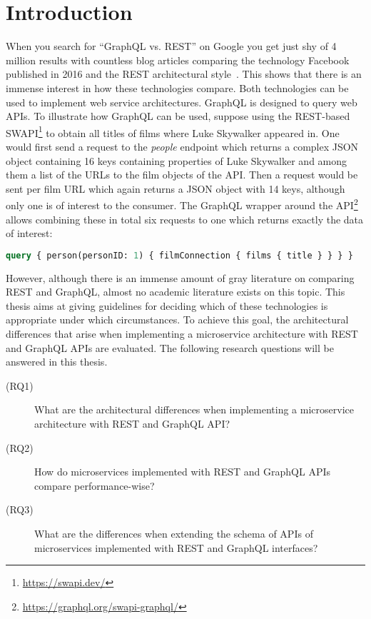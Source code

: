 \section{Introduction}\label{sec:introduction}

When you search for ``GraphQL vs. \acs{REST}'' on Google you get just shy of 4 million results with countless blog articles comparing the technology Facebook published in 2016 and the \acf{REST} architectural style~\cite{Brito2019}.
This shows that there is an immense interest in how these technologies compare.
Both technologies can be used to implement web service architectures.
GraphQL is designed to query web \acp{API}.
To illustrate how GraphQL can be used, suppose using the \ac{REST}-based \ac{SWAPI}\footnote{\url{https://swapi.dev/}} to obtain all titles of films where Luke Skywalker appeared in.
One would first send a request to the \textit{people} endpoint which returns a complex \ac{JSON} object containing 16 keys containing properties of Luke Skywalker and among them a list of the \acp{URL} to the film objects of the \ac{API}.
Then a request would be sent per film \ac{URL} which again returns a \ac{JSON} object with 14 keys, although only one is of interest to the consumer.
The GraphQL wrapper around the \ac{API}\footnote{\url{https://graphql.org/swapi-graphql/}} allows combining these in total six requests to one which returns exactly the data of interest:
\begin{lstlisting}[language=graphql]
query { person(personID: 1) { filmConnection { films { title } } } }
\end{lstlisting}



However, although there is an immense amount of gray literature on comparing \ac{REST} and GraphQL, almost no academic literature exists on this topic.
This thesis aims at giving guidelines for deciding which of these technologies is appropriate under which circumstances.
To achieve this goal, the architectural differences that arise when implementing a microservice architecture with \ac{REST} and GraphQL \acp{API} are evaluated.
The following research questions will be answered in this thesis.

\begin{description}
    \item[(\acs{RQ}1)] What are the architectural differences when implementing a microservice architecture with \ac{REST} and GraphQL \ac{API}?
    \item[(\acs{RQ}2)] How do microservices implemented with \ac{REST} and GraphQL \acp{API} compare performance-wise?
    \item[(\acs{RQ}3)] What are the differences when extending the schema of \acp{API} of microservices implemented with \ac{REST} and GraphQL interfaces?  
\end{description}

